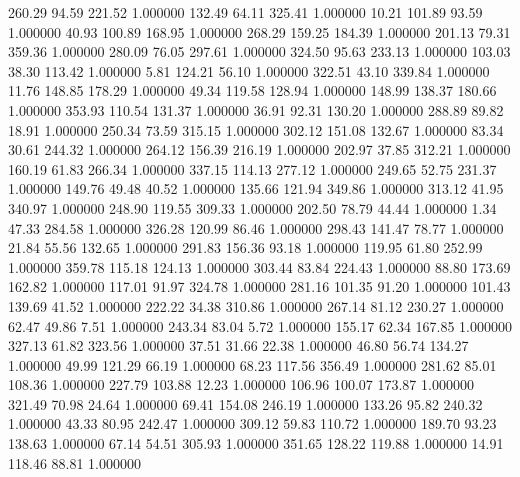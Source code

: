     260.29     94.59    221.52  1.000000
    132.49     64.11    325.41  1.000000
     10.21    101.89     93.59  1.000000
     40.93    100.89    168.95  1.000000
    268.29    159.25    184.39  1.000000
    201.13     79.31    359.36  1.000000
    280.09     76.05    297.61  1.000000
    324.50     95.63    233.13  1.000000
    103.03     38.30    113.42  1.000000
      5.81    124.21     56.10  1.000000
    322.51     43.10    339.84  1.000000
     11.76    148.85    178.29  1.000000
     49.34    119.58    128.94  1.000000
    148.99    138.37    180.66  1.000000
    353.93    110.54    131.37  1.000000
     36.91     92.31    130.20  1.000000
    288.89     89.82     18.91  1.000000
    250.34     73.59    315.15  1.000000
    302.12    151.08    132.67  1.000000
     83.34     30.61    244.32  1.000000
    264.12    156.39    216.19  1.000000
    202.97     37.85    312.21  1.000000
    160.19     61.83    266.34  1.000000
    337.15    114.13    277.12  1.000000
    249.65     52.75    231.37  1.000000
    149.76     49.48     40.52  1.000000
    135.66    121.94    349.86  1.000000
    313.12     41.95    340.97  1.000000
    248.90    119.55    309.33  1.000000
    202.50     78.79     44.44  1.000000
      1.34     47.33    284.58  1.000000
    326.28    120.99     86.46  1.000000
    298.43    141.47     78.77  1.000000
     21.84     55.56    132.65  1.000000
    291.83    156.36     93.18  1.000000
    119.95     61.80    252.99  1.000000
    359.78    115.18    124.13  1.000000
    303.44     83.84    224.43  1.000000
     88.80    173.69    162.82  1.000000
    117.01     91.97    324.78  1.000000
    281.16    101.35     91.20  1.000000
    101.43    139.69     41.52  1.000000
    222.22     34.38    310.86  1.000000
    267.14     81.12    230.27  1.000000
     62.47     49.86      7.51  1.000000
    243.34     83.04      5.72  1.000000
    155.17     62.34    167.85  1.000000
    327.13     61.82    323.56  1.000000
     37.51     31.66     22.38  1.000000
     46.80     56.74    134.27  1.000000
     49.99    121.29     66.19  1.000000
     68.23    117.56    356.49  1.000000
    281.62     85.01    108.36  1.000000
    227.79    103.88     12.23  1.000000
    106.96    100.07    173.87  1.000000
    321.49     70.98     24.64  1.000000
     69.41    154.08    246.19  1.000000
    133.26     95.82    240.32  1.000000
     43.33     80.95    242.47  1.000000
    309.12     59.83    110.72  1.000000
    189.70     93.23    138.63  1.000000
     67.14     54.51    305.93  1.000000
    351.65    128.22    119.88  1.000000
     14.91    118.46     88.81  1.000000
